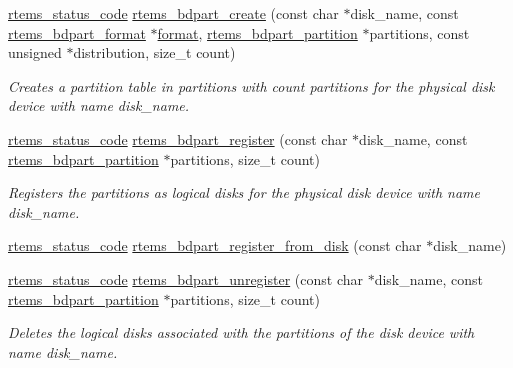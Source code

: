 \begin{DoxyCompactItemize}
\mbox{\hyperlink{group__ClassicStatus_ga545d41846817eaba6143d52ee4d9e9fe}{rtems\+\_\+status\+\_\+code}} \mbox{\hyperlink{group__rtems__bdpart_ga208abbe74a399a6e38115ab8eeab6eb5}{rtems\+\_\+bdpart\+\_\+create}} (const char $\ast$disk\+\_\+name, const \mbox{\hyperlink{unionrtems__bdpart__format}{rtems\+\_\+bdpart\+\_\+format}} $\ast$\mbox{\hyperlink{structformat}{format}}, \mbox{\hyperlink{structrtems__bdpart__partition}{rtems\+\_\+bdpart\+\_\+partition}} $\ast$partitions, const unsigned $\ast$distribution, size\+\_\+t count)
\begin{DoxyCompactList}\small\item\em Creates a partition table in {\itshape partitions} with {\itshape count} partitions for the physical disk device with name {\itshape disk\+\_\+name}. \end{DoxyCompactList}\item 
\mbox{\hyperlink{group__ClassicStatus_ga545d41846817eaba6143d52ee4d9e9fe}{rtems\+\_\+status\+\_\+code}} \mbox{\hyperlink{group__rtems__bdpart_ga36d215715c22ca86ce71f977ed760f4c}{rtems\+\_\+bdpart\+\_\+register}} (const char $\ast$disk\+\_\+name, const \mbox{\hyperlink{structrtems__bdpart__partition}{rtems\+\_\+bdpart\+\_\+partition}} $\ast$partitions, size\+\_\+t count)
\begin{DoxyCompactList}\small\item\em Registers the partitions as logical disks for the physical disk device with name {\itshape disk\+\_\+name}. \end{DoxyCompactList}\item 
\mbox{\hyperlink{group__ClassicStatus_ga545d41846817eaba6143d52ee4d9e9fe}{rtems\+\_\+status\+\_\+code}} \mbox{\hyperlink{group__rtems__bdpart_ga9b0517982a75560e134c808e70885b81}{rtems\+\_\+bdpart\+\_\+register\+\_\+from\+\_\+disk}} (const char $\ast$disk\+\_\+name)
\item 
\mbox{\hyperlink{group__ClassicStatus_ga545d41846817eaba6143d52ee4d9e9fe}{rtems\+\_\+status\+\_\+code}} \mbox{\hyperlink{group__rtems__bdpart_ga927be713792520f358b760d0e04fb5bf}{rtems\+\_\+bdpart\+\_\+unregister}} (const char $\ast$disk\+\_\+name, const \mbox{\hyperlink{structrtems__bdpart__partition}{rtems\+\_\+bdpart\+\_\+partition}} $\ast$partitions, size\+\_\+t count)
\begin{DoxyCompactList}\small\item\em Deletes the logical disks associated with the partitions of the disk device with name {\itshape disk\+\_\+name}. \end{DoxyCompactList}\item 

\end{DoxyCompactItemize}
